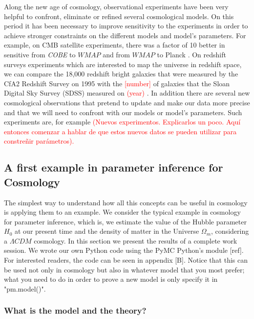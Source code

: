 \documentclass[onecolumn,           %
               showpacs,            %
               preprintnumbers,     %
               aps,                 %
               prl,          	    %
               letterpaper,             %
               superscriptaddress,      %
               nofootinbib,         %
               tightenlines,        %
               floats,floatfix      %
               ,usenatbib,
               ]{revtex4-1}
\begin{document}
Along the new age of cosmology, observational experiments have been very helpful to confront, eliminate or refined several cosmological models. On this period it has been necessary to improve sensitivity to the experiments in order to achieve stronger constraints on the different models and model's parameters. For example, on CMB satellite experiments, there was a factor of 10 better in sensitive from \textit{COBE} to $WMAP$ and from $WMAP$ to Planck \cite{cmbex}.  On redshift surveys experiments which are interested to map the universe in redshift space, we can compare the 18,000 redshift bright galaxies that were measured by the CfA2 Redshift Survey on 1995 with the \textcolor{red}{[number]} of galaxies that the Sloan Digital Sky Survey (SDSS) measured on \textcolor{red}{(year)} \cite{observ}. In addition there are several new cosmological observations that pretend to update and make our data more precise and that we will need to confront with our models or model's parameters. Such experiments are, for example \textcolor{red}{(Nuevos experimentos. Explicarlos un poco. Aqu\'i entonces comenzar a hablar de que estos nuevos datos se pueden utilizar para constre\~nir par\'ametros).}

\subsection{A first example in parameter inference for Cosmology}

The simplest way to understand how all this concepts can be useful in cosmology is applying them to an example. We consider the typical example in cosmology for parameter inference, which is, we estimate the value of the Hubble parameter $H_0$ at our present time and the density of matter in the Universe $\Omega_m$, considering a $\Lambda CDM$ cosmology. In this section we present the results of a complete work session. We wrote our own Python code using the PyMC Python's module [ref]. For interested readers, the code can be seen in appendix [B]. Notice that this can be used not only in cosmology but also in whatever model that you most prefer; what you need to do in order to prove a new model is only specify it in "pm.model()". 

\subsubsection{What is the model and the theory?}
\end{document}
